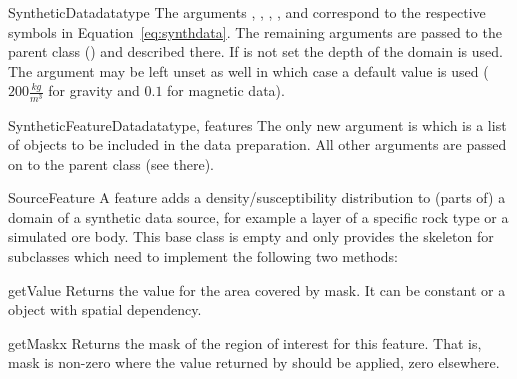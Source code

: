 \begin{classdesc}{SyntheticData}{datatype%
}
The arguments , , ,
, and  correspond to the respective symbols in
Equation~\ref{eq:synthdata}. The remaining arguments are passed to the parent
class () and described there.
If  is not set the depth of the domain is used.
The argument  may be left unset as well in which case a
default value is used ($200 \frac{kg}{m^3}$ for gravity and $0.1$ for magnetic
data).
\end{classdesc}

\begin{classdesc}{SyntheticFeatureData}{datatype, features%
}
The only new argument is  which is a list of
 objects to be included in the data preparation.
All other arguments are passed on to the parent class (see there).
\end{classdesc}

\begin{classdesc}{SourceFeature}{}
A feature adds a density/susceptibility distribution to (parts of) a domain of
a synthetic data source, for example a layer of a specific rock type or a
simulated ore body. This base class is empty and only provides the skeleton
for subclasses which need to implement the following two methods:
\end{classdesc}

\begin{methoddesc}[SourceFeature]{getValue}{}
Returns the value for the area covered by mask. It can be constant or a \Data
object with spatial dependency.
\end{methoddesc}

\begin{methoddesc}[SourceFeature]{getMask}{x}
Returns the mask of the region of interest for this feature. That is, mask is
non-zero where the value returned by  should be applied,
zero elsewhere.
\end{methoddesc}

